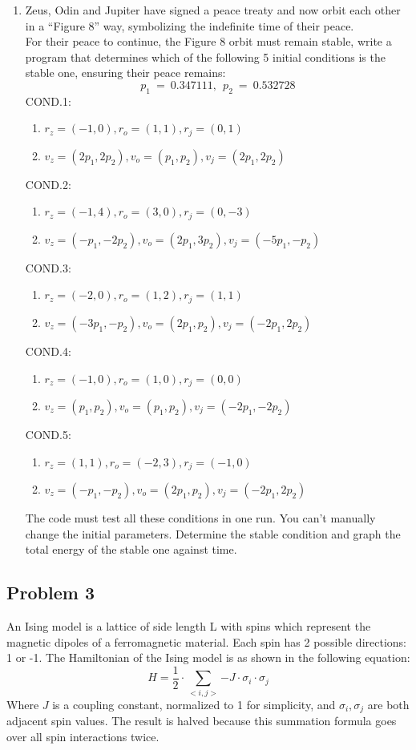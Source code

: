 \documentclass[12pt]{article}
\begin{document}
\begin{enumerate}
    \item Zeus, Odin and Jupiter have signed a peace treaty and now orbit each other in a “Figure 8” way, symbolizing the indefinite time of their peace.\\
    For their peace to continue, the Figure 8 orbit must remain stable, write a program that determines which of the following 5 initial conditions is the stable one,  ensuring their peace remains:
    $$p_1\ =\ 0.347111,\ \ p_2\ =\ 0.532728 $$
    COND.1:
    \begin{enumerate}
        \item $	r_z=(-1,0),  r_o=(1,1),  r_j=(0,1)$
        \item $	v_z=(2p_1,2p_2),  v_o=(p_1,p_2),  v_j=(2p_1,2p_2)$
    \end{enumerate}
    COND.2:
    \begin{enumerate}
        \item $	r_z=(-1,4),  r_o=(3,0),  r_j=(0,-3)$
        \item $	v_z=(-p_1,-2p_2),  v_o=(2p_1,3p_2),  v_j=(-5p_1,-p_2)$
    \end{enumerate}
    COND.3:
    \begin{enumerate}
        \item $	r_z=(-2,0),  r_o=(1,2),  r_j=(1,1)$
        \item $	v_z=(-3p_1,-p_2),  v_o=(2p_1,p_2),  v_j=(-2p_1,2p_2)$
    \end{enumerate}
    COND.4:
    \begin{enumerate}
        \item $	r_z=(-1,0),  r_o=(1,0),  r_j=(0,0)$
        \item $	v_z=(p_1,p_2),  v_o=(p_1,p_2),  v_j=(-2p_1,-2p_2)$
    \end{enumerate}
    COND.5:
    \begin{enumerate}
        \item $	r_z=(1,1),  r_o=(-2,3),  r_j=(-1,0)$
        \item $		v_z=(-p_1,-p_2),  v_o=(2p_1,p_2),  v_j=(-2p_1,2p_2)$
    \end{enumerate}
    The code must test all these conditions in one run. You can’t manually change the initial parameters. Determine the stable condition and graph the total energy of the stable one against time.
    
\end{enumerate}
\newpage
\subsection{Problem 3}
An Ising model is a lattice of side length L with spins which represent the magnetic dipoles of a ferromagnetic material. Each spin has 2 possible directions: 1 or -1. The Hamiltonian of the Ising model is as shown in the following equation:
$$H=\frac{1}{2}\cdot\sum_{<i,j>}{-J\cdot\sigma_i\cdot\sigma_j}$$
Where $J$ is a coupling constant, normalized to 1 for simplicity, and $\sigma_i, \sigma_j$ are both adjacent spin values. The result is halved because this summation formula goes over all spin interactions twice. 
\end{document}
